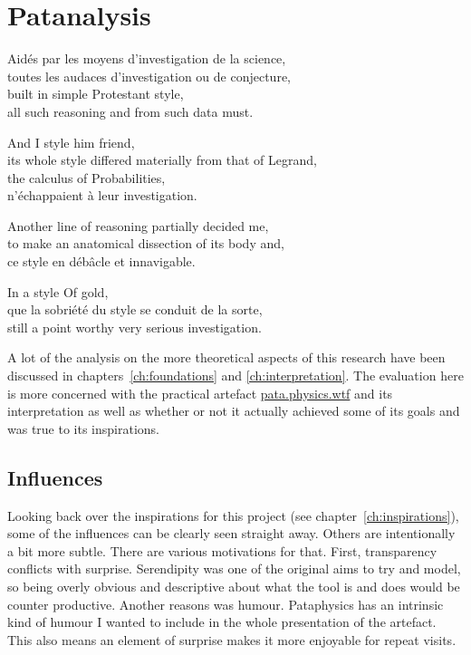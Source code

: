 
\chapter{Patanalysis}
\label{ch:analysis}

\startcontents[chapters]

\vfill

Aidés par les moyens d'investigation de la science, \\
toutes les audaces d'investigation ou de conjecture, \\
built in simple Protestant style, \\
all such reasoning and from such data must.

And I style him friend, \\
its whole style differed materially from that of Legrand, \\
the calculus of Probabilities, \\
n'échappaient à leur investigation.

Another line of reasoning partially decided me, \\
to make an anatomical dissection of its body and, \\
ce style en débâcle et innavigable.

In a style Of gold, \\
que la sobriété du style se conduit de la sorte, \\
still a point worthy very serious investigation.

\newpage
\minicontents
\spirals


A lot of the analysis on the more theoretical aspects of this research have been discussed in chapters~\ref{ch:foundations} and \ref{ch:interpretation}. The evaluation here is more concerned with the practical artefact \url{pata.physics.wtf} and its interpretation as well as whether or not it actually achieved some of its goals and was true to its inspirations.

\section{Influences}

Looking back over the inspirations for this project (see chapter~\ref{ch:inspirations}), some of the influences can be clearly seen straight away. Others are intentionally a bit more subtle. There are various motivations for that. First, transparency conflicts with surprise. Serendipity was one of the original aims to try and model, so being overly obvious and descriptive about what the tool is and does would be counter productive. Another reasons was humour. Pataphysics has an intrinsic kind of humour I wanted to include in the whole presentation of the artefact. This also means an element of surprise makes it more enjoyable for repeat visits.

